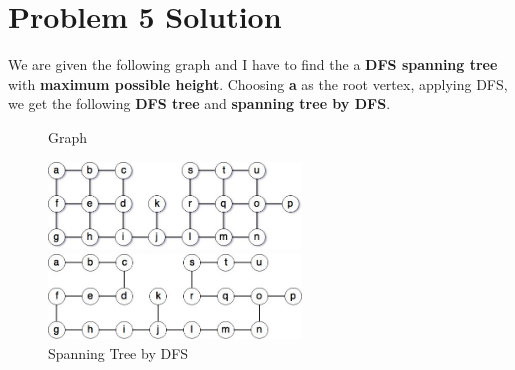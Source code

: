 \documentclass{article}
\let\bold\textbf
\begin{document}
\section{Problem 5 Solution}{
  We are given the following graph and I have to find the a \bold{DFS spanning tree} with \bold{maximum possible height}.
  \newline Choosing \bold{a} as the root vertex, applying DFS, we get the following \bold{DFS tree} and \bold{spanning tree by DFS}.
  \begin{figure}[h]
    \centering
    \begin{minipage}[h]{0.6\textwidth}
      \caption{Graph}
      \begin{minipage}[h]{0.5\paperheight}
        \includegraphics[width=0.6\textwidth]{graph}
      \end{minipage}
      \caption{Spanning Tree by DFS}
      \begin{minipage}[h]{0.5\paperheight}
        \includegraphics[width=0.6\textwidth]{DFS_spanning_tree}
      \end{minipage}
    \end{minipage}
    \hfill
    \begin{minipage}[h]{0.2\textwidth}

\end{minipage}
\end{figure}}
\end{document}
